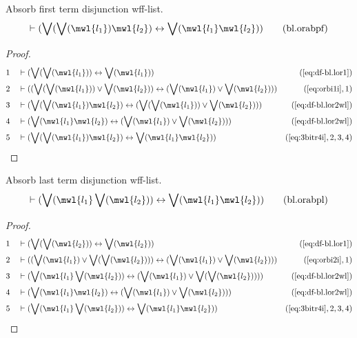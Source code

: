 \begin{lemma} Absorb first term disjunction wff-list.
\begin{align}
\vdash ( \bigvee( \bigvee( \mwl{l_1} ) \mwl{l_2} ) \leftrightarrow \bigvee(
    \mwl{l_1} \mwl{l_2} ) )\label{eq:bl.orabpf}\tag{bl.orabpf}
\end{align}
\end{lemma}

\begin{proof}
\begin{align}
  1 &&  & \vdash ( \bigvee( \bigvee( \mwl{l_1} ) ) \leftrightarrow \bigvee( \mwl{l_1} ) )&(\mbox{\ref{eq:df-bl.lor1}})\notag
  \\ 2 &&  & \vdash ( ( \bigvee( \bigvee( \mwl{l_1} ) ) \vee \bigvee( \mwl{l_2} ) ) \leftrightarrow ( \bigvee( \mwl{l_1} ) \vee \bigvee( \mwl{l_2} ) ) )&(\mbox{\ref{eq:orbi1i}},1)\notag
  \\ 3 &&  & \vdash ( \bigvee( \bigvee( \mwl{l_1} ) \mwl{l_2} ) \leftrightarrow ( \bigvee( \bigvee( \mwl{l_1} ) ) \vee \bigvee( \mwl{l_2} ) ) )&(\mbox{\ref{eq:df-bl.lor2wl}})\notag
  \\ 4 &&  & \vdash ( \bigvee( \mwl{l_1} \mwl{l_2} ) \leftrightarrow ( \bigvee( \mwl{l_1} ) \vee \bigvee( \mwl{l_2} ) ) )&(\mbox{\ref{eq:df-bl.lor2wl}})\notag
  \\ 5 &&  & \vdash ( \bigvee( \bigvee( \mwl{l_1} ) \mwl{l_2} ) \leftrightarrow \bigvee( \mwl{l_1} \mwl{l_2} ) )&(\mbox{\ref{eq:3bitr4i}},2,3,4)\notag
\end{align}
\end{proof}

\begin{lemma} Absorb last term disjunction wff-list.
\begin{align}
\vdash ( \bigvee( \mwl{l_1} \bigvee( \mwl{l_2} ) ) \leftrightarrow \bigvee(
    \mwl{l_1} \mwl{l_2} ) )\label{eq:bl.orabpl}\tag{bl.orabpl}
\end{align}
\end{lemma}

\begin{proof}
\begin{align}
  1 &&  & \vdash ( \bigvee( \bigvee( \mwl{l_2} ) ) \leftrightarrow \bigvee( \mwl{l_2} ) )&(\mbox{\ref{eq:df-bl.lor1}})\notag
  \\ 2 &&  & \vdash ( ( \bigvee( \mwl{l_1} ) \vee \bigvee( \bigvee( \mwl{l_2} ) ) ) \leftrightarrow ( \bigvee( \mwl{l_1} ) \vee \bigvee( \mwl{l_2} ) ) )&(\mbox{\ref{eq:orbi2i}},1)\notag
  \\ 3 &&  & \vdash ( \bigvee( \mwl{l_1} \bigvee( \mwl{l_2} ) ) \leftrightarrow ( \bigvee( \mwl{l_1} ) \vee \bigvee( \bigvee( \mwl{l_2} ) ) ) )&(\mbox{\ref{eq:df-bl.lor2wl}})\notag
  \\ 4 &&  & \vdash ( \bigvee( \mwl{l_1} \mwl{l_2} ) \leftrightarrow ( \bigvee( \mwl{l_1} ) \vee \bigvee( \mwl{l_2} ) ) )&(\mbox{\ref{eq:df-bl.lor2wl}})\notag
  \\ 5 &&  & \vdash ( \bigvee( \mwl{l_1} \bigvee( \mwl{l_2} ) ) \leftrightarrow \bigvee( \mwl{l_1} \mwl{l_2} ) )&(\mbox{\ref{eq:3bitr4i}},2,3,4)\notag
\end{align}
\end{proof}

